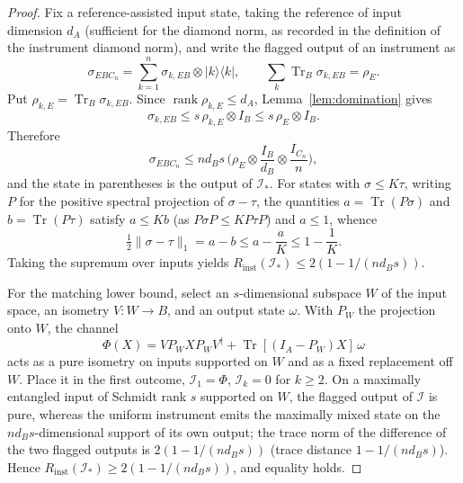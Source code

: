 \documentclass[11pt,a4paper]{article}
\newcommand{\Tr}{\operatorname{Tr}}
\newcommand{\rank}{\operatorname{rank}}
\begin{document}
\begin{proof}
Fix a reference-assisted input state, taking the reference of input dimension $d_A$ (sufficient for the diamond norm, as recorded in the definition of the instrument diamond norm), and write the flagged output of an instrument as
\[
\sigma_{EBC_n}=\sum_{k=1}^n\sigma_{k,EB}\otimes|k\rangle\langle k|,\qquad
\sum_k\Tr_B\sigma_{k,EB}=\rho_E.
\]
Put $\rho_{k,E}=\Tr_B\sigma_{k,EB}$. Since $\rank\rho_{k,E}\le d_A$, Lemma~\ref{lem:domination} gives
\[
\sigma_{k,EB}\le s\,\rho_{k,E}\otimes I_B\le s\,\rho_E\otimes I_B.
\]
Therefore
\[
\sigma_{EBC_n}\le nd_Bs\,\Big(\rho_E\otimes\frac{I_B}{d_B}\otimes\frac{I_{C_n}}n\Big),
\]
and the state in parentheses is the output of $\mathcal I_*$. For states with $\sigma\le K\tau$, writing $P$ for the positive spectral projection of $\sigma-\tau$, the quantities $a=\Tr(P\sigma)$ and $b=\Tr(P\tau)$ satisfy $a\le Kb$ (as $P\sigma P\le KP\tau P$) and $a\le1$, whence
\[
\tfrac12\|\sigma-\tau\|_1=a-b\le a-\frac aK\le1-\frac1K.
\]
Taking the supremum over inputs yields $R_{\mathrm{inst}}(\mathcal I_*)\le2(1-1/(nd_Bs))$.

For the matching lower bound, select an $s$-dimensional subspace $W$ of the input space, an isometry $V:W\to B$, and an output state $\omega$. With $P_W$ the projection onto $W$, the channel
\[
\Phi(X)=VP_WXP_WV^\dagger+\Tr[(I_A-P_W)X]\,\omega
\]
acts as a pure isometry on inputs supported on $W$ and as a fixed replacement off $W$. Place it in the first outcome, $\mathcal I_1=\Phi$, $\mathcal I_k=0$ for $k\ge2$. On a maximally entangled input of Schmidt rank $s$ supported on $W$, the flagged output of $\mathcal I$ is pure, whereas the uniform instrument emits the maximally mixed state on the $nd_Bs$-dimensional support of its own output; the trace norm of the difference of the two flagged outputs is $2(1-1/(nd_Bs))$ (trace distance $1-1/(nd_Bs)$). Hence $R_{\mathrm{inst}}(\mathcal I_*)\ge2(1-1/(nd_Bs))$, and equality holds.


\end{proof}
\end{document}
